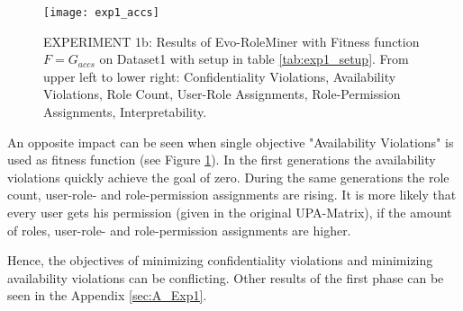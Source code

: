 \begin{figure}[H]
    \centering
    \texttt{[image: exp1\_accs]}
    \caption{EXPERIMENT 1b: Results of Evo-RoleMiner with Fitness function $F=G_{accs}$ on Dataset1 with setup in table \ref{tab:exp1_setup}. From upper left to lower right: Confidentiality Violations, Availability Violations, Role Count, User-Role Assignments, Role-Permission Assignments, Interpretability.}
    \label{fig:exp1_accs}
\end{figure}

An opposite impact can be seen when single objective "Availability Violations" is used as fitness function (see Figure \ref{fig:exp1_accs}). In the first generations the availability violations quickly achieve the goal of zero. During the same generations the role count, user-role- and role-permission assignments are rising. It is more likely that every user gets his permission (given in the original UPA-Matrix), if the amount of roles, user-role- and role-permission assignments are higher.

Hence, the objectives of minimizing confidentiality violations and minimizing availability violations can be conflicting. Other results of the first phase can be seen in the Appendix \ref{sec:A_Exp1}.